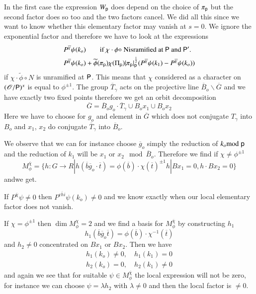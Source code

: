 \begin{remark*}
In the first case the expression $W_{\mathsf{p}}$ does depend on the choice of $\pi_{\mathsf{p}}$ but the second factor does so too and the two factors cancel. We did all this since we want to know whether this elementary factor may vanish at $s=0$. We ignore the exponential factor and therefore we have to look at the expressions
\begin{align*}
& P^{\overline{\chi}}\psi(k_{o})\qquad \text{if $\chi\cdot \phi\circ$ Nisramified at $\mathsf{P}$ and $\mathsf{P}'$.}\\
& P^{\overline{\chi}}\psi(k_{o})+\widetilde{\phi}(\pi_{\mathsf{p}})\chi(\Pi_{\mathsf{p}})|\pi_{\mathsf{p}}|^{\frac{1}{2}}_{\mathsf{p}}(P^{\overline{\chi}}\psi(k_{1})-P^{\overline{\chi}}\psi(k_{o}))
\end{align*}
if $\chi\cdot \widetilde{\phi}\circ N$ is unramified at $\mathsf{P}$. This means that $\chi$ considered as a character on $(\mathscr{O}/\mathsf{P})^{x}$ is equal to $\phi^{\pm 1}$. The group $\overline{T}_{\gamma}$ acts on the projective line $\overline{B}_{o}\backslash \overline{G}$ and we have exactly two fixed points therefore we get an orbit decomposition
$$
\overline{G}=\overline{B}_{o}g_{o}\cdot \overline{T}_{\gamma}\cup B_{o}x_{1}\cup B_{o}x_{2}
$$
Here we have to choose for $g_{o}$ and element in $\overline{G}$ which does not conjugate $T_{\gamma}$ into $B_{o}$ and $x_{1}$, $x_{2}$ do conjugate $\overline{T}_{\gamma}$ into $\overline{B}_{o}$.
\end{remark*}

We observe that we can for instance choose $\overline{g}_{o}$ simply the reduction of $k_{o}{\rm{mod}}\kern.3em \mathsf{p}$ and the reduction of $k_{1}$ will be $x_{1}$ or $x_{2}\mod \overline{B}_{o}$. Therefore we find if $\chi\neq \phi^{\pm 1}$
$$
M^{\overline{\chi}}_{\phi}=\{h:G\to R|h(\overline{b}\overline{g}_{o}\cdot \overline{t})=\phi(\overline{b})\cdot \chi(\overline{t})^{\pm 1}h|Bx_{1}=0,h\cdot Bx_{2}=0\}
$$
and\pageoriginale we get.

If $P^{\overline{\chi}}\psi\neq 0$ then $P^{\overline{chi}}\psi(k_{o})\neq 0$ and we know exactly when our local elementary factor does not vanish.

If $\chi=\phi^{\pm 1}$ then $\dim M^{\chi}_{\phi}=2$ and we find a basis for $M^{\overline{\chi}}_{\phi}$ by constructing $h_{1}$
$$
h_{1}(\overline{b}\overline{g}_{o}\overline{t})=\phi(\overline{b})\cdot \chi^{-1}(\overline{t})
$$
and $h_{2}\neq 0$ concentrated on $Bx_{1}$ or $Bx_{2}$. Then we have
\begin{align*}
h_{1}(k_{o})\neq 0,\quad h_{1}(k_{1})=0\\
h_{2}(k_{o})=0,\quad h_{2}(k_{1})\neq 0
\end{align*}
and again we see that for suitable $\psi\in M^{\overline{\chi}}_{\phi}$ the local expression will not be zero, for instance we can choose $\psi=\lambda h_{2}$ with $\lambda\neq 0$ and then the local factor is $\neq 0$.

